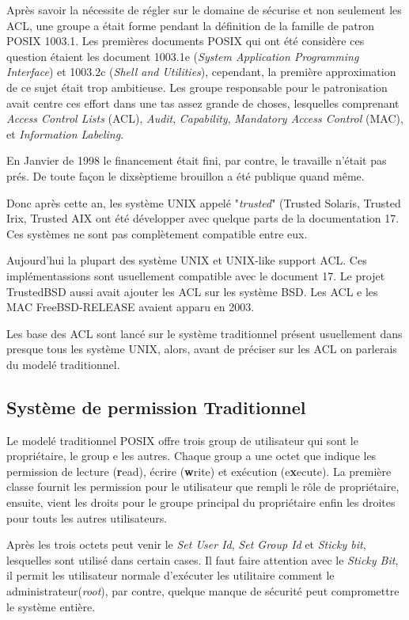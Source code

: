 \documentclass[draft]{article}
\begin{document}
Après savoir la nécessite de régler sur le domaine de sécurise et non seulement les ACL, une groupe a était forme pendant la définition de la famille de patron POSIX 1003.1. Les premières documents POSIX qui ont été considère ces question étaient les document 1003.1e (\emph{System Application Programming Interface}) et 1003.2c (\emph{Shell and Utilities}), cependant, la première approximation de ce sujet était trop ambitieuse. Les groupe responsable pour le patronisation avait centre ces effort dans une tas assez grande de choses, lesquelles  comprenant \emph{Access Control Lists} (ACL), \emph{Audit}, \emph{Capability},\emph{ Mandatory Access Control }(MAC), et \emph{Information Labeling}\cite{aclsuse}.

En Janvier de 1998\cite{aclsuse} le financement était fini, par contre, le travaille n'était pas prés. De toute façon le dixsèptieme brouillon a été publique quand même\cite{posix17}.

Donc après cette an, les système UNIX appelé "\emph{trusted}" (Trusted Solaris, Trusted Irix, Trusted AIX ont été développer avec quelque parts de la documentation 17. Ces systèmes ne sont pas complètement compatible entre eux. 

Aujourd'hui la plupart des système UNIX et UNIX-like support ACL. Ces implémentassions sont usuellement compatible avec le document 17. Le projet TrustedBSD aussi avait ajouter les ACL sur les système BSD. Les ACL e les MAC  FreeBSD-RELEASE avaient apparu en 2003.

Les base des ACL sont lancé sur le système traditionnel présent usuellement dans presque tous les système UNIX, alors, avant de préciser sur les ACL on parlerais du modelé traditionnel.

\subsection*{Système de permission Traditionnel}

Le modelé traditionnel POSIX offre trois group de utilisateur qui sont le propriétaire, le group e les autres. Chaque group a une octet que indique les permission de lecture (\textbf{r}ead), écrire (\textbf{w}rite) et exécution (e\textbf{x}ecute). La première classe fournit les permission pour le utilisateur que rempli le rôle de propriétaire, ensuite, vient les droits pour le groupe principal du propriétaire enfin les droites pour touts les autres utilisateurs. 
 
Après les trois octets peut venir le \emph{Set User Id}, \emph{Set Group Id} et \emph{Sticky bit}, lesquelles sont utilisé dans certain cases. Il faut faire attention avec le \emph{Sticky Bit}, il permit les utilisateur normale d'exécuter les utilitaire comment le administrateur(\emph{root}), par contre, quelque manque de sécurité peut compromettre le système entière.
\end{document}

